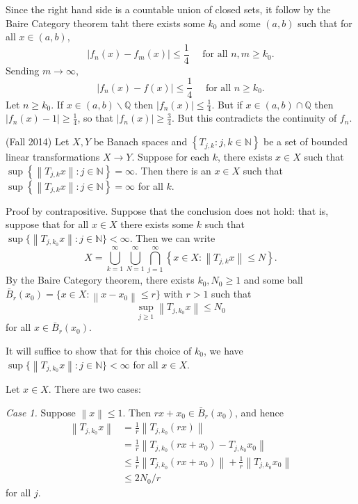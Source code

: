 \documentclass[answers]{exam}
\theoremstyle{problemstyle}
\newcommand{\norm}[1]{\left\lVert#1\right\rVert} %
\newcommand{\1}[1]{\textbf{1}_{\left[#1\right]}} %
\def\Q{\mathbb{Q}} %
\begin{document}
\begin{questions}
\begin{solution}
  Since the right hand side is a countable union of closed sets, it follow by the Baire Category theorem taht there exists some $k_{0}$ and some $(a,b)$ such that for all $x\in (a,b)$,
  \begin{equation*}
    |f_{n}(x)-f_{m}(x)| \leq \frac{1}{4}\quad\text{ for all }n,m\geq k_{0}.
  \end{equation*}
  Sending $m\to \infty$,
  \begin{equation*}
    |f_{n}(x)-f(x)| \leq \frac{1}{4}\quad\text{ for all }n\geq k_{0}.
  \end{equation*}
  Let $n\geq k_{0}$. If $x\in (a,b)\backslash \Q$ then $|f_{n}(x)|\leq \frac{1}{4}$. But if $x\in (a,b)\cap \Q$ then $|f_{n}(x)-1|\geq \frac{1}{4}$, so that $|f_{n}(x)|\geq \frac{3}{4}$. But this contradicts the continuity of $f_{n}$.
\end{solution}


\item (Fall 2014)
  Let $X,Y$ be Banach spaces and $\left\{ T_{j,k}: j,k\in \mathbb{N} \right\}$ be a set of bounded linear transformations $X\to Y$. Suppose for each $k$, there exists $x\in X$ such that $\sup \left\{ \norm{T_{j,k}x}:  j\in \mathbb{N} \right\} = \infty.$ Then there is an $x\in X$ such that $\sup \left\{ \norm{T_{j,k} x} : j\in \mathbb{N}\right\} = \infty$ for all $k.$
  \begin{solution}
    Proof by contrapositive. Suppose that the conclusion does not hold: that is, suppose that for all $x\in X$ there exists some $k$ such that $\sup \{\norm{T_{j,k_{0}}x}:j\in\mathbb{N}\}<\infty$. Then we can write
\begin{equation*}
  X=\bigcup_{k= 1}^{\infty} \bigcup_{N= 1}^{\infty} \bigcap_{j= 1}^{\infty} \left\{ x\in X: \norm{T_{j,k}x}\leq N \right\}.
\end{equation*}
By the Baire Category theorem, there exists $k_{0},N_{0}\geq 1$ and some ball $\bar{B}_{r}(x_{0})= \{x\in X : \norm{x-x_0}\leq r\}$ with $r>1$ such that $$\sup_{j\geq 1}\norm{T_{j,k_{0}}x}\leq N_{0}$$ for all $x\in \bar{B}_r(x_0)$.

It will suffice to show that for this choice of $k_{0}$, we have $\sup \{\norm{T_{j,k_{0}}x}: j\in \mathbb{N}\}<\infty$ for all $x\in X$.

Let $x\in X$. There are two cases:

\textit{Case 1.} Suppose $\norm{x}\leq 1$. Then $rx+x_{0}\in \bar{B}_{r}(x_{0})$, and hence
\begin{align*}
  \norm{T_{j,k_{0}}x}
  &= \frac{1}{r}\norm{T_{j,k_{0}}(rx)}\\ 
  &=  \frac{1}{r} \norm{T_{j,k_{0}}(rx + x_{0})-T_{j,k_{0}}x_{0}}\\ 
  &\leq \frac{1}{r}\norm{T_{j,k_{0}}(rx + x_{0})} +\frac{1}{r}\norm{T_{j,k_{0}}x_{0}}\\ 
  &\leq 2N_{0}/r
\end{align*}
for all $j$.


\end{solution}
\end{questions}
\end{document}
